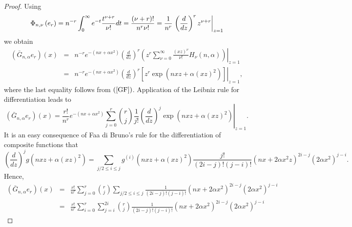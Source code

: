 \documentclass[11pt,a4paper]{article}
\begin{document}
\begin{proof}
Using 
\begin{equation*}
\Phi _{n,\nu }\left( e_{r}\right) =n^{-r}\int_{0}^{\infty }e^{-t}\frac{%
t^{\nu +r}}{\nu !}dt=\frac{\left( \nu +r\right) !}{n^{r}\nu !}=\frac{1}{n^{r}%
}\left. \left( \frac{d}{dz}\right) ^{r}z^{\nu +r}\right\vert _{z=1}
\end{equation*}%
we obtain\ 
\begin{eqnarray*}
\left( \bar{G}_{n,\alpha }e_{r}\right) \left( x\right) &=&n^{-r}e^{-\left(
nx+\alpha x^{2}\right) }\left. \left( \frac{d}{dz}\right) ^{r}\left(
z^{r}\sum_{\nu =0}^{\infty }\frac{\left( xz\right) ^{\nu }}{\nu !}H_{\nu
}\left( n,\alpha \right) \right) \right\vert _{z=1} \\
&=&n^{-r}e^{-\left( nx+\alpha x^{2}\right) }\left. \left( \frac{d}{dz}%
\right) ^{r}\left[ z^{r}\exp \left( nxz+\alpha \left( xz\right) ^{2}\right) %
\right] \right\vert _{z=1},
\end{eqnarray*}%
where the last equality follows from $\left( \ref{GF}\right) $. Application
of the Leibniz rule for differentiation leads to 
\begin{equation*}
\left( \bar{G}_{n,\alpha }e_{r}\right) \left( x\right) =\frac{r!}{n^{r}}%
e^{-\left( nx+\alpha x^{2}\right) }\sum_{j=0}^{r}\binom{r}{j}\frac{1}{j!}%
\left. \left( \frac{d}{dz}\right) ^{j}\exp \left( nxz+\alpha \left(
xz\right) ^{2}\right) \right\vert _{z=1}.
\end{equation*}%
It is an easy consequence of Faa di Bruno's rule for the differentiation of
composite functions that 
\begin{equation*}
\left( \frac{d}{dz}\right) ^{j}g\left( nxz+\alpha \left( xz\right)
^{2}\right) =\sum_{j/2\leq i\leq j}g^{\left( i\right) }\left( nxz+\alpha
\left( xz\right) ^{2}\right) \frac{j!}{\left( 2i-j\right) !\left( j-i\right)
!}\left( nx+2\alpha x^{2}z\right) ^{2i-j}\left( 2\alpha x^{2}\right) ^{j-i}.
\end{equation*}%
Hence, 
\begin{eqnarray*}
\left( \bar{G}_{n,\alpha }e_{r}\right) \left( x\right) &=&\frac{r!}{n^{r}}%
\sum_{j=0}^{r}\binom{r}{j}\sum_{j/2\leq i\leq j}\frac{1}{\left( 2i-j\right)
!\left( j-i\right) !}\left( nx+2\alpha x^{2}\right) ^{2i-j}\left( 2\alpha
x^{2}\right) ^{j-i} \\
&=&\frac{r!}{n^{r}}\sum_{i=0}^{r}\sum_{j=i}^{2i}\binom{r}{j}\frac{1}{\left(
2i-j\right) !\left( j-i\right) !}\left( nx+2\alpha x^{2}\right)
^{2i-j}\left( 2\alpha x^{2}\right) ^{j-i}
\end{eqnarray*}%

\end{proof}
\end{document}
